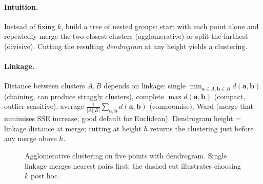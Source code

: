 \paragraph{Intuition.} Instead of fixing $k$, build a tree of nested groups: start with each point alone and repeatedly merge the two closest clusters (agglomerative) or split the farthest (divisive). Cutting the resulting \emph{dendrogram} at any height yields a clustering.

\paragraph{Linkage.} Distance between clusters $A,B$ depends on linkage: single $\min_{\mathbf{a}\in A,\mathbf{b}\in B}d(\mathbf{a},\mathbf{b})$ (chaining, can produce straggly clusters), complete $\max d(\mathbf{a},\mathbf{b})$ (compact, outlier-sensitive), average $\frac1{|A||B|}\sum_{\mathbf{a},\mathbf{b}}d(\mathbf{a},\mathbf{b})$ (compromise), Ward (merge that minimises SSE increase, good default for Euclidean). Dendrogram height = linkage distance at merge; cutting at height $h$ returns the clustering just before any merge above $h$.

\begin{figure}[h]\centering
{}
\caption{Agglomerative clustering on five points with dendrogram. Single linkage merges nearest pairs first; the dashed cut illustrates choosing $k$ post hoc.}
\label{fig:dendrogram}
\end{figure}

